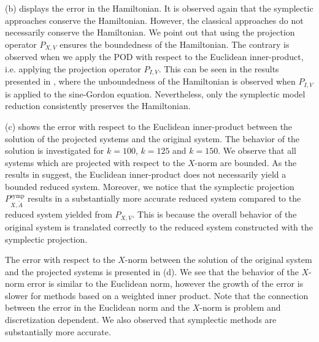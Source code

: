 (b) displays the error in the Hamiltonian. It is observed again that the symplectic approaches conserve the Hamiltonian. However, the classical approaches do not necessarily conserve the Hamiltonian. We point out that using the projection operator $P_{X,V}$ ensures the boundedness of the Hamiltonian. The contrary is observed when we apply the POD with respect to the Euclidean inner-product, i.e. applying the projection operator $P_{I,V}$. This can be seen in the results presented in \cite{doi:10.1137/140978922}, where the unboundedness of the Hamiltonian is observed when $P_{I,V}$ is applied to the sine-Gordon equation. Nevertheless, only the symplectic model reduction consistently preserves the Hamiltonian.

(c) shows the error with respect to the Euclidean inner-product between the solution of the projected systems and the original system. The behavior of the solution is investigated for $k=100$, $k=125$ and $k=150$. We observe that all systems which are projected with respect to the $X$-norm are bounded. As the results in \cite{doi:10.1137/140978922} suggest, the Euclidean inner-product does not necessarily yield a bounded reduced system. Moreover, we notice that the symplectic projection $P^{\text{symp}}_{X,\tilde A}$ results in a substantially more accurate reduced system compared to the reduced system yielded from $P_{X,V}$. This is because the overall behavior of the original system is translated correctly to the reduced system constructed with the symplectic projection.

The error with respect to the $X$-norm between the solution of the original system and the projected systems is presented in (d). We see that the behavior of the $X$-norm error is similar to the Euclidean norm, however the growth of the error is slower for methods based on a weighted inner product. Note that the connection between the error in the Euclidean norm and the $X$-norm is problem and discretization dependent. We also observed that symplectic methods are substantially more accurate.

